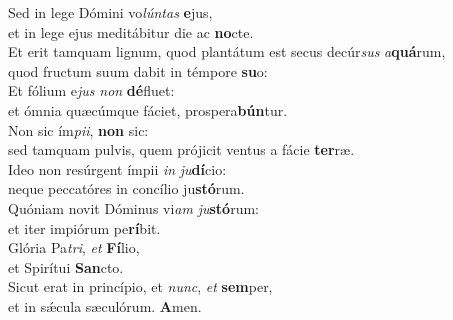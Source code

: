 \evenverse Sed in lege Dómini vo\textit{lún}\textit{tas} \textbf{e}jus,~\*\\
\evenverse et in lege ejus meditábitur die ac \textbf{no}cte.\\
\oddverse Et erit tamquam lignum, quod plantátum est secus decúr\textit{sus} \textit{a}\textbf{quá}rum,~\*\\
\oddverse quod fructum suum dabit in témpore \textbf{su}o:\\
\evenverse Et fólium e\textit{jus} \textit{non} \textbf{dé}fluet:~\*\\
\evenverse et ómnia quæcúmque fáciet, prospera\textbf{bún}tur.\\
\oddverse Non sic ím\textit{pi}\textit{i}, \textbf{non} sic:~\*\\
\oddverse sed tamquam pulvis, quem prójicit ventus a fácie \textbf{ter}ræ.\\
\evenverse Ideo non resúrgent ímpii \textit{in} \textit{ju}\textbf{dí}cio:~\*\\
\evenverse neque peccatóres in concílio ju\textbf{stó}rum.\\
\oddverse Quóniam novit Dóminus vi\textit{am} \textit{ju}\textbf{stó}rum:~\*\\
\oddverse et iter impiórum pe\textbf{rí}bit.\\
\evenverse Glória Pa\textit{tri}, \textit{et} \textbf{Fí}lio,~\*\\
\evenverse et Spirítui \textbf{San}cto.\\
\oddverse Sicut erat in princípio, et \textit{nunc}, \textit{et} \textbf{sem}per,~\*\\
\oddverse et in sǽcula sæculórum. \textbf{A}men.\\
